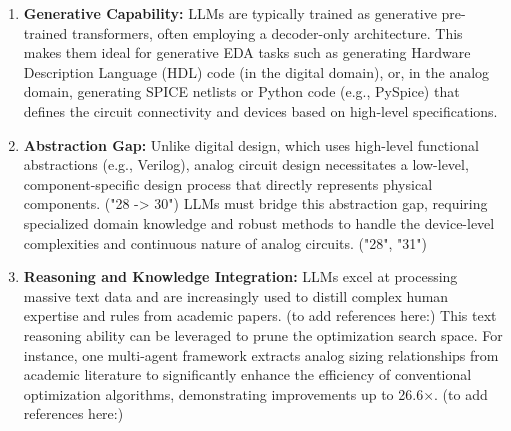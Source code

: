 \documentclass{ieeeaccess}
\begin{document}
\begin{enumerate} %
	\item \textbf{Generative Capability:} LLMs are typically trained as generative pre-trained transformers, often employing a decoder-only architecture. This makes them ideal for generative EDA tasks such as generating Hardware Description Language (HDL) code (in the digital domain), or, in the analog domain, generating SPICE netlists or Python code (e.g., PySpice) that defines the circuit connectivity and devices based on high-level specifications.

	\item \textbf{Abstraction Gap:} Unlike digital design, which uses high-level functional abstractions (e.g., Verilog), analog circuit design necessitates a low-level, component-specific design process that directly represents physical components. ("28 -> 30") LLMs must bridge this abstraction gap, requiring specialized domain knowledge and robust methods to handle the device-level complexities and continuous nature of analog circuits. ("28", "31")

	\item \textbf{Reasoning and Knowledge Integration:} LLMs excel at processing massive text data and are increasingly used to distill complex human expertise and rules from academic papers. (to add references here:) This text reasoning ability can be leveraged to prune the optimization search space. For instance, one multi-agent framework extracts analog sizing relationships from academic literature to significantly enhance the efficiency of conventional optimization algorithms, demonstrating improvements up to 26.6×. (to add references here:)


\end{enumerate}
\end{document}
